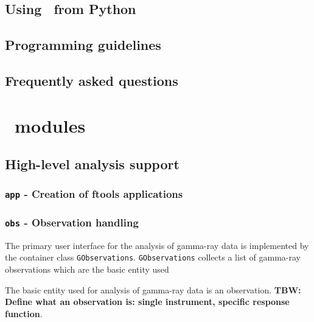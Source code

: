 \documentclass{article}[12pt,a4]
\begin{document}
\subsection{Using \this\ from Python}

\subsection{Programming guidelines}

\subsection{Frequently asked questions}






\clearpage
\section{\this\ modules}

\subsection{High-level analysis support}

\subsubsection{{\tt app} - Creation of ftools applications}
\label{sec:app}


\subsubsection{{\tt obs} - Observation handling}
\label{sec:obs}

The primary user interface for the analysis of gamma-ray data is implemented by
the container class {\tt GObservations}.
{\tt GObservations} collects a list of gamma-ray observations which are the basic
entity used

The basic entity used for analysis of gamma-ray data is an observation.
{\bf TBW: Define what an observation is: single instrument, specific response function}.
\end{document}
